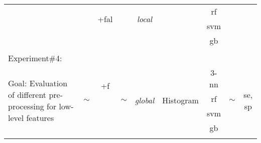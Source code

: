 \begin{landscape}
\begin{table}[ht]
{\begin{center}
{\begin{tabular}{l  c	 c  c  c  c  c  c  c }
 & & \multirow{2}{*}{+\acs{fal}} & & \multirow{2}{*}{\emph{local}} &  & \ac{rf} & & \\
 & & & & & & \ac{svm} & & \\
 & & & & & & \ac{gb} & & \\
\midrule
\\
Experiment\#4:\\
\multirow{4}{4cm}{Goal: Evaluation of different pre-processing for low-level features} & \multirow{4}{*}{$\sim$} & \multirow{2}{*}{ +\acs{f}} & \multirow{4}{*}{$\sim$} & \multirow{4}{*}{\emph{global}} & \multirow{4}{*}{Histogram} & $3$-\ac{nn} & \multirow{4}{*}{$\sim$} & \multirow{4}{*}{\ac{se}, \ac{sp}}\\
& & \multirow{2}{*}{+\ac{fal}} & & & & \ac{rf} &  &\\
& & & & & & \ac{svm} & & \\
& & & & & & \ac{gb} & & \\
\\
\bottomrule


\end{tabular}}
\end{center}}
\label{tab:table4}
\end{table}
\end{landscape}
